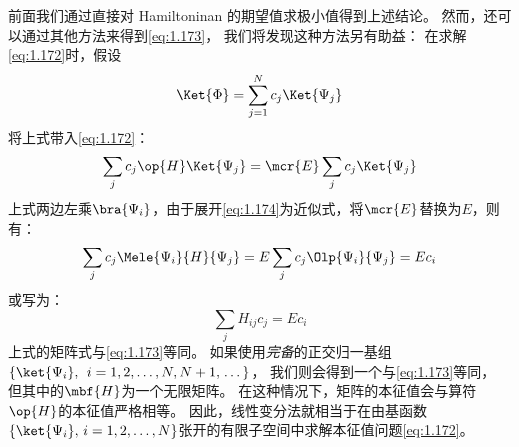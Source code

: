 前面我们通过直接对 Hamiltoninan 的期望值求极小值得到上述结论。
然而，还可以通过其他方法来得到\autoref{eq:1.173}，
我们将发现这种方法另有助益：
在求解\autoref{eq:1.172}时，假设
\begin{equation}
 \Ket{\Phi} = \sum_{j=1}^N c_j\Ket{\Psi_j}
 \label{eq:1.174}
\end{equation}
将上式带入\autoref{eq:1.172}：
\begin{equation}
 \sum_j c_j \op{H}\Ket{\Psi_j} = \mcr{E} \sum_j c_j \Ket{\Psi_j}
 \label{eq:1.175}
\end{equation}
上式两边左乘$\bra{\Psi_i}$，由于展开\autoref{eq:1.174}为近似式，将$\mcr{E}$替换为$E$，则有：
\[
\sum_j c_j \Mele{\Psi_i}{H}{\Psi_j} = E\sum_j c_j \Olp{\Psi_i}{\Psi_j} = Ec_i
\]
或写为：
\begin{equation}
 \sum_j H_{ij}c_j = E c_i
 \label{eq:1.176}
\end{equation}
上式的矩阵式与\autoref{eq:1.173}等同。
如果使用\emph{完备}的正交归一基组 $\left\{\ket{\Psi_i},
\right. \, i = 1, 2,\allowbreak \dots, N, N+1, \left.\dots \right\}$，
我们则会得到一个与\autoref{eq:1.173}等同，
但其中的$\mbf{H}$为一个无限矩阵。
在这种情况下，矩阵的本征值会与算符$\op{H}$的本征值严格相等。
因此，线性变分法就相当于在由基函数$\left\{\ket{\Psi_i},\,i=1,2,\dots,N\right\}$张开的有限子空间中求解本征值问题\autoref{eq:1.172}。
 
 
 
